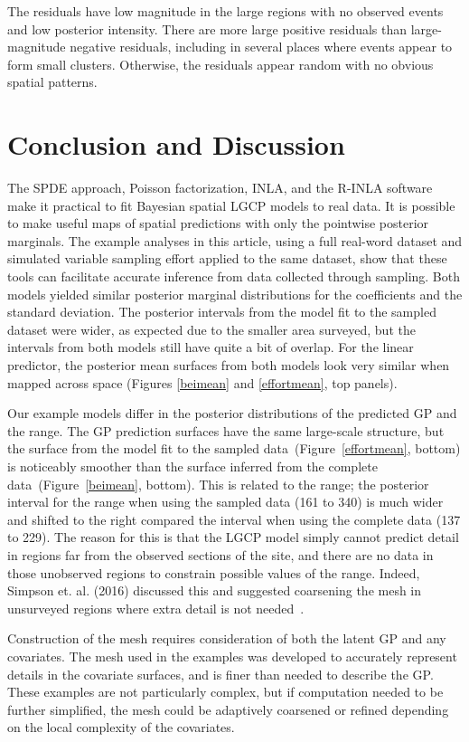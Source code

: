 \documentclass{interact}
\begin{document}
The residuals have low magnitude in the large regions with no observed events
and low posterior intensity. There are more large positive residuals than
large-magnitude negative residuals, including in several places where events
appear to form small clusters. Otherwise, the residuals appear random with no
obvious spatial patterns.


\section{Conclusion and Discussion}
\label{conclusion}

The SPDE approach, Poisson factorization, INLA, and the R-INLA software make
it practical to fit Bayesian spatial LGCP models to real data. It is possible
to make useful maps of spatial predictions with only the pointwise posterior
marginals. The example analyses in this article, using a full real-word dataset and
simulated variable sampling effort applied to the same dataset, show that these
tools can facilitate accurate inference from data collected through sampling.
Both models yielded similar posterior marginal distributions for the
coefficients and the standard deviation. The posterior intervals from the
model fit to the sampled dataset were wider, as expected due to the smaller
area surveyed, but the intervals from both models still have quite a bit of
overlap. For the linear predictor, the posterior mean surfaces from both models
look very similar when mapped across space (Figures \ref{beimean} and
\ref{effortmean}, top panels).

Our example models differ in the posterior distributions of the predicted GP
and the range. The GP prediction surfaces have the same large-scale structure,
but the surface from the model fit to the sampled
data~(Figure~\ref{effortmean}, bottom) is noticeably smoother than the surface
inferred from the complete data~(Figure~\ref{beimean}, bottom).
This is related to the range; the posterior interval for the range when using
the sampled data (161 to 340) is much wider and shifted to the right compared
the interval when using the complete data (137 to 229). The reason for this is
that the LGCP model simply cannot predict detail in regions far from the
observed sections of the site, and there are no data in those unobserved
regions to constrain possible values of the range. Indeed, Simpson et. al.
(2016) discussed this and suggested coarsening the mesh in unsurveyed regions
where extra detail is not needed~\cite{simpsonetal}.

Construction of the mesh requires consideration of both the latent GP and any
covariates. The mesh used in the examples was developed to accurately represent
details in the covariate surfaces, and is finer than needed to describe the
GP. These examples are not particularly complex, but if computation needed
to be further simplified, the mesh could be adaptively coarsened or refined
depending on the local complexity of the covariates.
\end{document}
